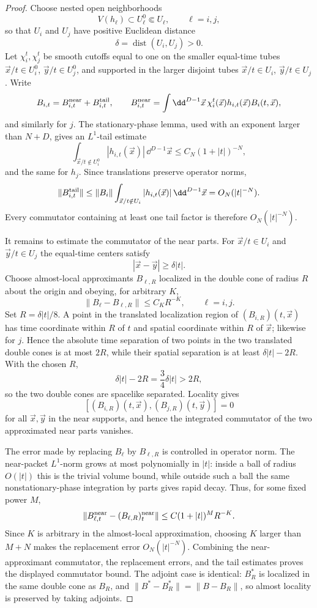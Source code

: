 \begin{proof}
Choose nested open neighborhoods
\[
  V(h_\ell)\subset U_\ell^0\Subset U_\ell,\qquad \ell=i,j,
\]
so that \(U_i\) and \(U_j\) have positive Euclidean distance
\[
  \delta=\operatorname{dist}(U_i,U_j)>0 .
\]
Let \(\chi_i^t,\chi_j^t\) be smooth cutoffs equal to one on the smaller
equal-time tubes \(\vec x/t\in U_i^0\), \(\vec y/t\in U_j^0\), and supported
in the larger disjoint tubes \(\vec x/t\in U_i\), \(\vec y/t\in U_j\).
Write
\[
  B_{i,t}=B_{i,t}^{\rm near}+B_{i,t}^{\rm tail},
  \qquad
  B_{i,t}^{\rm near}
  =
  \int \dd^{D-1}\vec x\,\chi_i^t(\vec x)h_{i,t}(\vec x)B_i(t,\vec x),
\]
and similarly for \(j\).  The stationary-phase lemma, used with an exponent
larger than \(N+D\), gives an \(L^1\)-tail estimate
\[
  \int_{\vec x/t\notin U_i^0}|h_{i,t}(\vec x)|\,\dd^{D-1}\vec x
  \le C_N(1+|t|)^{-N},
\]
and the same for \(h_j\).  Since translations preserve operator norms,
\[
  \|B_{i,t}^{\rm tail}\|
  \le \|B_i\|
  \int_{\vec x/t\notin U_i}|h_{i,t}(\vec x)|\,\dd^{D-1}\vec x
  =
  O_N(|t|^{-N}) .
\]
Every commutator containing at least one tail factor is therefore
\(O_N(|t|^{-N})\).

It remains to estimate the commutator of the near parts.  For
\(\vec x/t\in U_i\) and \(\vec y/t\in U_j\) the equal-time centers satisfy
\[
  |\vec x-\vec y|\ge \delta |t| .
\]
Choose almost-local approximants \(B_{\ell,R}\) localized in the double cone
of radius \(R\) about the origin and obeying, for arbitrary \(K\),
\[
  \|B_\ell-B_{\ell,R}\|\le C_K R^{-K},
  \qquad \ell=i,j .
\]
Set \(R=\delta |t|/8\).  A point in the translated localization region of
\((B_{i,R})(t,\vec x)\) has time coordinate within \(R\) of \(t\) and spatial
coordinate within \(R\) of \(\vec x\); likewise for \(j\).  Hence the
absolute time separation of two points in the two translated double cones is
at most \(2R\), while their spatial separation is at least
\(\delta |t|-2R\).  With the chosen \(R\),
\[
  \delta |t|-2R=\frac34\delta |t|>2R,
\]
so the two double cones are spacelike separated.  Locality gives
\[
  [(B_{i,R})(t,\vec x),(B_{j,R})(t,\vec y)]=0
\]
for all \(\vec x,\vec y\) in the near supports, and hence the integrated
commutator of the two approximated near parts vanishes.

The error made by replacing \(B_\ell\) by \(B_{\ell,R}\) is controlled in
operator norm.  The near-packet \(L^1\)-norm grows at most polynomially in
\(|t|\): inside a ball of radius \(O(|t|)\) this is the trivial volume bound,
while outside such a ball the same nonstationary-phase integration by parts
gives rapid decay.  Thus, for some fixed power \(M\),
\[
  \|B_{\ell,t}^{\rm near}-(B_{\ell,R})_{t}^{\rm near}\|
  \le C(1+|t|)^M R^{-K}.
\]
Since \(K\) is arbitrary in the almost-local approximation, choosing
\(K\) larger than \(M+N\) makes the replacement error \(O_N(|t|^{-N})\).
Combining the near-approximant commutator, the replacement errors, and the
tail estimates proves the displayed commutator bound.  The adjoint case is
identical: \(B_R^*\) is localized in the same double cone as \(B_R\), and
\(\|B^*-B_R^*\|=\|B-B_R\|\), so almost locality is preserved by taking
adjoints.
\end{proof}

